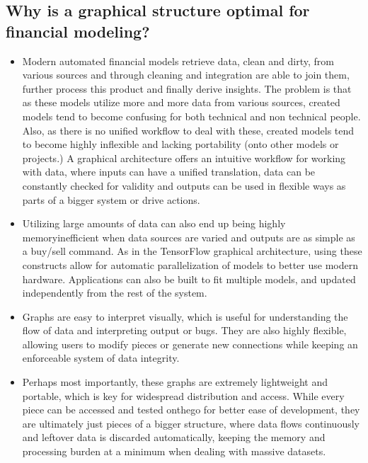 \documentclass[letterpaper,10pt,english]{sphinxmanual}
\begin{document}
\subsection{Why is a graphical structure optimal for financial modeling?}
\label{\detokenize{beginners-guide:why-is-a-graphical-structure-optimal-for-financial-modeling}}\begin{itemize}
\item {} 
Modern automated financial models retrieve data, clean and dirty, from various sources and through cleaning and integration are able to join them, further process this product and finally derive insights. The problem is that as these models utilize more and more data from various sources, created models tend to become confusing for both technical and non technical people. Also, as there is no unified workflow to deal with these, created models tend to become highly inflexible and lacking portability (onto other models or projects.) A graphical architecture offers an intuitive workflow for working with data, where inputs can have a unified translation, data can be constantly checked for validity and outputs can be used in flexible ways as parts of a bigger system or drive actions.

\item {} 
Utilizing large amounts of data can also end up being highly memory\sphinxhyphen{}inefficient when data sources are varied and outputs are as simple as a buy/sell command. As in the TensorFlow graphical architecture, using these constructs allow for automatic parallelization of models to better use modern hardware. Applications can also be built to fit multiple models, and updated independently from the rest of the system.

\item {} 
Graphs are easy to interpret visually, which is useful for understanding the flow of data and interpreting output or bugs. They are also highly flexible, allowing users to modify pieces or generate new connections while keeping an enforceable system of data integrity.

\item {} 
Perhaps most importantly, these graphs are extremely lightweight and portable, which is key for widespread distribution and access. While every piece can be accessed and tested on\sphinxhyphen{}the\sphinxhyphen{}go for better ease of development, they are ultimately just pieces of a bigger structure, where data flows continuously and leftover data is discarded automatically, keeping the memory and processing burden at a minimum when dealing with massive datasets.

\end{itemize}
\end{document}
